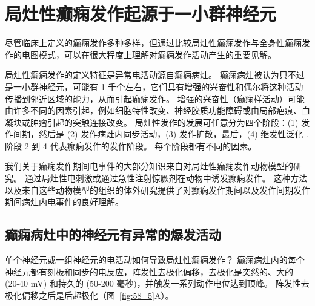 \section{局灶性癫痫发作起源于一小群神经元}

尽管临床上定义的癫痫发作多种多样，但通过比较局灶性癫痫发作与全身性癫痫发作的电图模式，可以在很大程度上理解对癫痫发作活动产生的重要见解。


局灶性癫痫发作的定义特征是异常电活动源自癫痫病灶。
癫痫病灶被认为只不过是一小群神经元，可能有 1 千个左右，它们具有增强的兴奋性和偶尔将这种活动传播到邻近区域的能力，从而引起癫痫发作。
增强的兴奋性（癫痫样活动）可能由许多不同的因素引起，例如细胞特性改变、神经胶质功能障碍或由局部疤痕、血凝块或肿瘤引起的突触连接改变。
局灶性发作的发展可任意分为四个阶段：(1) 发作间期，然后是 (2) 发作病灶内同步活动，(3) 发作扩散，最后，(4) 继发性泛化 . 阶段 2 到 4 代表癫痫发作的发作阶段。
每个阶段都有不同的因素。


我们关于癫痫发作期间电事件的大部分知识来自对局灶性癫痫发作动物模型的研究。
通过局灶性电刺激或通过急性注射惊厥剂在动物中诱发癫痫发作。
这种方法以及来自这些动物模型的组织的体外研究提供了对癫痫发作期间以及发作间期发作期间病灶内电事件的良好理解。



\subsection{癫痫病灶中的神经元有异常的爆发活动}

单个神经元或一组神经元的电活动如何导致局灶性癫痫发作？
癫痫病灶内的每个神经元都有刻板和同步的电反应，阵发性去极化偏移，去极化是突然的、大的 (20-40 mV) 和持久的 (50-200 毫秒)，并触发一系列动作电位达到顶峰。
阵发性去极化偏移之后是后超极化（图~\ref{fig:58_5}A）。


